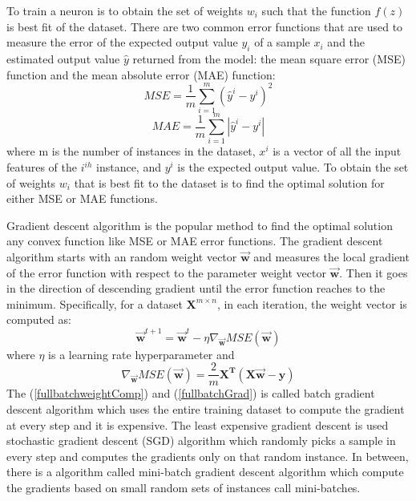 \documentclass{article}
\begin{document}
To train a neuron is to obtain the set of weights $w_i$ such that the function $f(z)$ is best fit of the dataset. There are two common error functions that are used to measure the error of the expected output value $y_i$ of a sample $x_i$ and the estimated output value $\hat{y}$ returned from the model: the mean square error (MSE) function and the mean absolute error (MAE) function:
\begin{equation}
MSE = \frac{1}{m}\sum_{i=1}^{m}(\hat{y}^i - y^i)^2 
\end{equation}
\begin{equation}
MAE = \frac{1}{m}\sum_{i=1}^{m}|\hat{y}^i - y^i|
\end{equation}
where m is the number of instances in the dataset, $x^i$ is a vector of all the input features of the $i^{ih}$ instance, and $y^i$ is the expected output value. To obtain the set of weights $w_i$ that is best fit to the dataset is to find the optimal solution for either MSE or MAE functions. 

Gradient descent algorithm is the popular method to find the optimal solution any convex function like MSE or MAE error functions. The gradient descent algorithm starts with an random weight vector $\vec{\mathbf{w}}$ and measures the local gradient of the error function with respect to the parameter weight vector $\vec{\mathbf{w}}$. Then it goes in the direction of descending gradient until the error function reaches to the minimum. Specifically, for a dataset $\mathbf{X}^{m \times n}$, in each iteration, the weight vector is computed as:
\begin{equation} \label{fullbatchweightComp}
\mathbf{\vec{w}}^{t+1} = \mathbf{\vec{w}}^t - \eta\nabla_{\mathbf{\vec{w}}}MSE(\mathbf{\vec{w}}) 
\end{equation}
where $\eta$ is a learning rate hyperparameter and
\begin{equation} \label{fullbatchGrad}
\nabla_{\mathbf{\vec{w}}}MSE(\mathbf{\vec{w}})= \frac{2}{m}\mathbf{X^T}(\mathbf{X}\vec{\mathbf{w}} - \mathbf{y})
\end{equation}
The (\ref{fullbatchweightComp}) and (\ref{fullbatchGrad}) is called batch gradient descent algorithm which uses the entire training dataset to compute the gradient at every step and it is expensive. The least expensive gradient descent is used stochastic gradient descent (SGD) algorithm which randomly picks a sample in every step and computes the gradients only on that random instance. In between, there is a algorithm called mini-batch gradient descent algorithm which compute the gradients based on small random sets of instances call mini-batches. 
\end{document}
